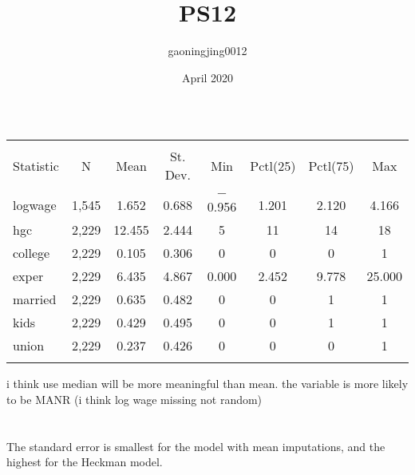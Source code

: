 \documentclass{article}
\title{PS12}
\author{gaoningjing0012 }
\date{April 2020}
\begin{document}
\section{}
\begin{table}[!htbp] \centering 
  \caption{} 
  \label{} 
\begin{tabular}{@{\extracolsep{5pt}}lccccccc} 
\\[-1.8ex]\hline 
\hline \\[-1.8ex] 
Statistic & \multicolumn{1}{c}{N} & \multicolumn{1}{c}{Mean} & \multicolumn{1}{c}{St. Dev.} & \multicolumn{1}{c}{Min} & \multicolumn{1}{c}{Pctl(25)} & \multicolumn{1}{c}{Pctl(75)} & \multicolumn{1}{c}{Max} \\ 
\hline \\[-1.8ex] 
logwage & 1,545 & 1.652 & 0.688 & $-$0.956 & 1.201 & 2.120 & 4.166 \\ 
hgc & 2,229 & 12.455 & 2.444 & 5 & 11 & 14 & 18 \\ 
college & 2,229 & 0.105 & 0.306 & 0 & 0 & 0 & 1 \\ 
exper & 2,229 & 6.435 & 4.867 & 0.000 & 2.452 & 9.778 & 25.000 \\ 
married & 2,229 & 0.635 & 0.482 & 0 & 0 & 1 & 1 \\ 
kids & 2,229 & 0.429 & 0.495 & 0 & 0 & 1 & 1 \\ 
union & 2,229 & 0.237 & 0.426 & 0 & 0 & 0 & 1 \\ 
\hline \\[-1.8ex] 
\end{tabular} 
\end{table} 
 i think use median will be more meaningful than mean.
 the variable is more likely to be MANR (i think log wage missing not random)
 
 \section{}
 The standard error is smallest for the model with mean imputations,  and the highest for the Heckman model. 
\end{document}
